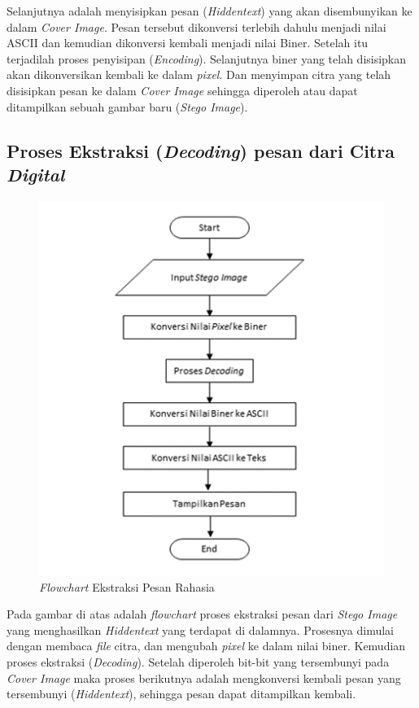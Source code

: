 	Selanjutnya adalah menyisipkan pesan (\emph{Hiddentext}) yang akan disembunyikan ke dalam \emph{Cover Image}. Pesan tersebut dikonversi terlebih dahulu menjadi nilai ASCII dan kemudian dikonversi kembali menjadi nilai Biner. Setelah itu terjadilah proses penyisipan (\emph{Encoding}). Selanjutnya biner yang telah disisipkan akan dikonversikan kembali ke dalam \emph{pixel}. Dan menyimpan citra yang telah disisipkan pesan ke dalam \emph{Cover Image} sehingga diperoleh atau	dapat ditampilkan sebuah gambar baru (\emph{Stego Image}).
	
	\subsection{Proses Ekstraksi (\emph{Decoding}) pesan dari Citra \emph{Digital}}
	
	\begin{figure}[H]
		\centering
		\includegraphics[height=0.6\textheight]{gambar/ekstraksi3}
		\caption{\emph{Flowchart} Ekstraksi Pesan Rahasia}
		\label{flowchart_ekstraksi}
	\end{figure}

	Pada gambar di atas adalah \emph{flowchart} proses ekstraksi pesan dari \emph{Stego Image} yang menghasilkan \emph{Hiddentext} yang terdapat di dalamnya. Prosesnya dimulai dengan membaca \emph{file} citra, dan mengubah \emph{pixel} ke dalam nilai biner. Kemudian proses ekstraksi (\emph{Decoding}). Setelah diperoleh bit-bit yang tersembunyi pada \emph{Cover Image} maka proses berikutnya adalah mengkonversi kembali pesan yang tersembunyi (\emph{Hiddentext}), sehingga pesan dapat ditampilkan kembali.

